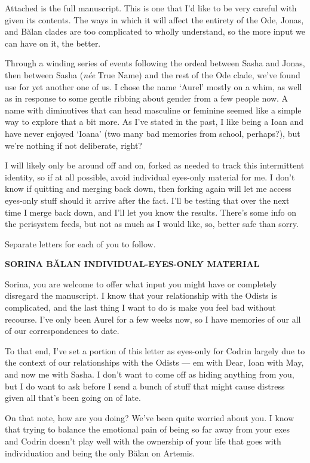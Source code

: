 Attached is the full manuscript. This is one that I'd like to be very careful with given its contents. The ways in which it will affect the entirety of the Ode, Jonas, and Bălan clades are too complicated to wholly understand, so the more input we can have on it, the better.

Through a winding series of events following the ordeal between Sasha and Jonas, then between Sasha (\emph{née} True Name) and the rest of the Ode clade, we've found use for yet another one of us. I chose the name `Aurel' mostly on a whim, as well as in response to some gentle ribbing about gender from a few people now. A name with diminutives that can head masculine or feminine seemed like a simple way to explore that a bit more. As I've stated in the past, I like being a Ioan and have never enjoyed `Ioana' (two many bad memories from school, perhaps?), but we're nothing if not deliberate, right?

I will likely only be around off and on, forked as needed to track this intermittent identity, so if at all possible, avoid individual eyes-only material for me. I don't know if quitting and merging back down, then forking again will let me access eyes-only stuff should it arrive after the fact. I'll be testing that over the next time I merge back down, and I'll let you know the results. There's some info on the perisystem feeds, but not as much as I would like, so, better safe than sorry.

Separate letters for each of you to follow.

\textbf{SORINA BĂLAN INDIVIDUAL-EYES-ONLY MATERIAL}

Sorina, you are welcome to offer what input you might have or completely disregard the manuscript. I know that your relationship with the Odists is complicated, and the last thing I want to do is make you feel bad without recourse. I've only been Aurel for a few weeks now, so I have memories of our all of our correspondences to date.

To that end, I've set a portion of this letter as eyes-only for Codrin largely due to the context of our relationships with the Odists — em with Dear, Ioan with May, and now me with Sasha. I don't want to come off as hiding anything from you, but I do want to ask before I send a bunch of stuff that might cause distress given all that's been going on of late.

On that note, how are you doing? We've been quite worried about you. I know that trying to balance the emotional pain of being so far away from your exes and Codrin doesn't play well with the ownership of your life that goes with individuation and being the only Bălan on Artemis.

